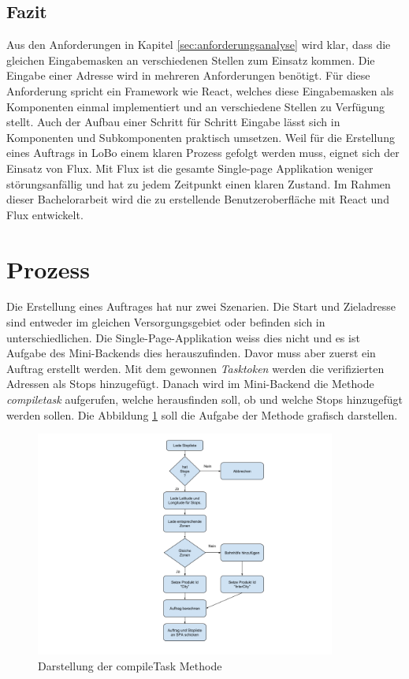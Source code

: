 \subsection{Fazit}
Aus den Anforderungen in Kapitel \ref{sec:anforderungsanalyse} wird klar, dass die gleichen Eingabemasken an verschiedenen Stellen zum Einsatz kommen. Die Eingabe einer Adresse wird in mehreren Anforderungen benötigt. Für diese Anforderung spricht ein Framework wie React, welches diese Eingabemasken als Komponenten einmal implementiert und an verschiedene Stellen zu Verfügung stellt. Auch der Aufbau einer Schritt für Schritt Eingabe lässt sich in Komponenten und Subkomponenten praktisch umsetzen. Weil für die Erstellung eines Auftrags in LoBo einem klaren Prozess gefolgt werden muss, eignet sich der Einsatz von Flux. Mit Flux ist die gesamte Single-page Applikation weniger störungsanfällig und hat zu jedem Zeitpunkt einen klaren Zustand. Im Rahmen dieser Bachelorarbeit wird die zu erstellende Benutzeroberfläche mit React und Flux entwickelt.

\section{Prozess}
Die Erstellung eines Auftrages hat nur zwei Szenarien. Die Start und Zieladresse sind entweder im gleichen Versorgungsgebiet oder befinden sich in unterschiedlichen. Die Single-Page-Applikation weiss dies nicht und es ist Aufgabe des Mini-Backends dies herauszufinden. Davor muss aber zuerst ein Auftrag erstellt werden. Mit dem gewonnen \textit{Tasktoken} werden die verifizierten Adressen als Stops hinzugefügt. Danach wird im Mini-Backend die Methode \textit{compiletask} aufgerufen, welche herausfinden soll, ob und welche Stops hinzugefügt werden sollen. Die Abbildung \ref{fig:compiletask} soll die Aufgabe der Methode grafisch darstellen.

\begin{figure}[ht]
	\centering
  \includegraphics[width=0.88\textwidth]{images/compileTask.png}
	\caption{Darstellung der compileTask Methode}
	\label{fig:compiletask}
\end{figure}

